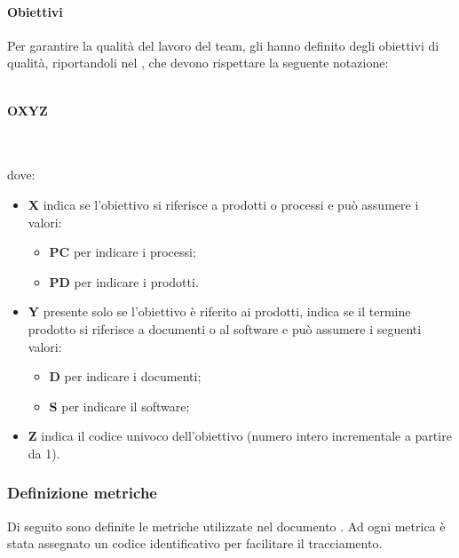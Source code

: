 \paragraph{Obiettivi}
Per garantire la qualità del lavoro del team, gli \AMMP{} hanno definito degli obiettivi di qualità,
riportandoli nel \PQdoc, che devono rispettare la seguente notazione:\\ \\
\centerline{\textbf{O\textbraceleft{}X\textbraceright{}\textbraceleft{}Y\textbraceright{}\textbraceleft{}Z\textbraceright{}}} \\ \\
dove:
\begin{itemize}
	\item \textbf{X} indica se l'obiettivo si riferisce a prodotti o processi e può assumere i valori:
	\begin{itemize}
		\item \textbf{PC} per indicare i processi;
		\item \textbf{PD} per indicare i prodotti.
	\end{itemize}
	\item \textbf{Y} presente solo se l'obiettivo è riferito ai prodotti, indica se il termine prodotto si riferisce a documenti o al software e può assumere i seguenti valori:
	\begin{itemize}
		\item \textbf{D} per indicare i documenti;
		\item \textbf{S} per indicare il software;
	\end{itemize}
	\item \textbf{Z} indica il codice univoco dell'obiettivo (numero intero incrementale a partire da 1).
\end{itemize}
\subsubsection{Definizione metriche}
Di seguito sono definite le metriche utilizzate nel documento \PQdocRP{}. Ad ogni metrica è stata assegnato un codice identificativo per facilitare il tracciamento.
